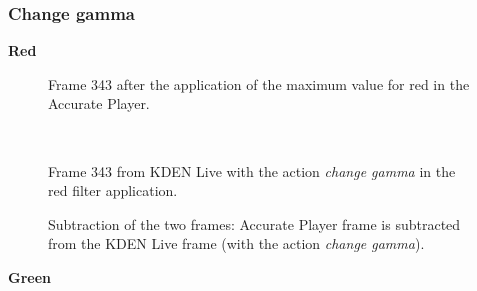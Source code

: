 \documentclass[../MasterThesis.tex]{subfiles}
\begin{document}
\subsubsection*{Change gamma}

\vspace*{-1em}

\textbf{Red}

\vspace*{-1em}

\begin{minipage}{0.48\textwidth}
	\begin{figure}[H]
		\begin{center}
			\caption[]{Frame 343 after the application of the maximum value for red in the Accurate Player.}
		\end{center}
	\end{figure}
\end{minipage}\begin{minipage}{0.04\textwidth}
	\ 
\end{minipage}\begin{minipage}{0.48\textwidth}
	\begin{figure}[H]
		\begin{center}
			\caption[]{Frame 343 from KDEN Live with the action \textit{change gamma} in the red filter application.}
		\end{center}
	\end{figure}
\end{minipage}

\vspace*{-1em}

\begin{figure}[H]
	\begin{center}
		\caption[]{Subtraction of the two frames: Accurate Player frame is subtracted from the KDEN Live frame (with the action \textit{change gamma}).}
	\end{center}
\end{figure}






\vspace*{-1em}

\textbf{Green}

\vspace*{-1em}
\end{document}
